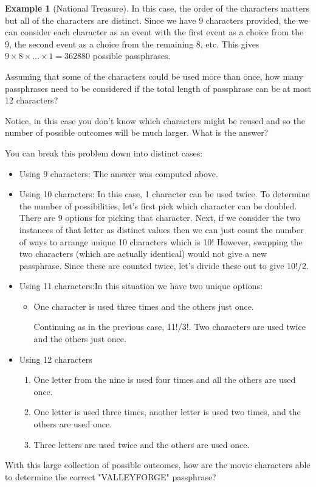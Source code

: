 \documentclass[10pt,]{book}
\theoremstyle{plain}
\theoremstyle{definition}
\theoremstyle{definition}
\newtheorem{example}[theorem]{Example}
\theoremstyle{definition}
\numberwithin{equation}{section}
\begin{document}
\begin{example}[National Treasure]
		In this case, the order of the characters matters but all of the 
		characters are distinct. Since we have 9 characters provided, the we can
		consider each character as an event with the first event as a choice
		from the 9, the second event as a choice from the remaining 8, etc. This
		gives \(9 \times 8 \times ... \times 1 = 362880\) possible 
		passphrases.
\par
Assuming that some of the characters could be used more than once, 
		how many passphrases need to be considered if the total length
		of passphrase can be at most 12 characters?%
\par
Notice, in this case you don't know which characters might be reused and so the number of possible outcomes will be much larger. What is the answer?%
\par
You can break this problem down into distinct cases:
		\leavevmode%
\begin{itemize}[label=\textbullet]
\item{}Using 9 characters: The answer was computed above.%
\item{}Using 10 characters: In this case, 1 character can be used twice. To determine the number of possibilities, let's first pick which character can be doubled. There are 9 options for picking that character.  Next, if we consider the two instances of that letter as distinct values then we can just count the number of ways to arrange unique 10 characters which is 10! However, swapping the two characters (which are actually identical) would not give a new passphrase. Since these are counted twice, let's divide these out to give 10!/2.%
\item{}Using 11 characters:In this situation we have two unique options:
\begin{itemize}[label=$\circ$]
\item{}One character is used three times and the others just once.%
\par
Continuing as in the previous case, 11!/3!.%
Two characters are used twice and the others just once.\end{itemize}

\item{}Using 12 characters%
%
\begin{enumerate}
\item\hypertarget{li-71}{}One letter from the nine is used four times and all the others are used once.%
\item\hypertarget{li-72}{}One letter is used three times, another letter is used two times, and the others are used once.%
\item\hypertarget{li-73}{}Three letters are used twice and the others are used once.%
\end{enumerate}
\end{itemize}

\par
With this large collection of possible outcomes, how are the movie
		characters able to determine the correct "VALLEYFORGE" passphrase?%
\end{example}
\typeout{************************************************}
\typeout{************************************************}
\end{document}
